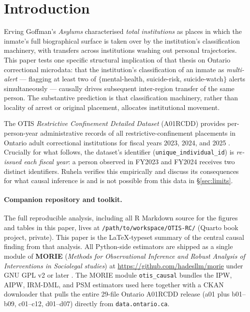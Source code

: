 \documentclass[11pt,a4paper]{article}
\newcommand{\1}{\mathbf{1}}
\theoremstyle{plain}
\theoremstyle{definition}
\begin{document}
\section{Introduction}\label{sec:intro}

Erving Goffman's \emph{Asylums} \cite{goffman1961asylums}
characterised \emph{total institutions} as places in which the
inmate's full biographical surface is taken over by the institution's
classification machinery, with transfers across institutions washing
out personal trajectories.  This paper tests one specific structural
implication of that thesis on Ontario correctional microdata: that
the institution's classification of an inmate as \emph{multi-alert}
— flagging at least two of $\{$mental-health, suicide-risk,
suicide-watch$\}$ alerts simultaneously — causally drives subsequent
inter-region transfer of the same person.  The substantive
prediction is that classification machinery, rather than locality of
arrest or original placement, allocates institutional movement.

The OTIS \emph{Restrictive Confinement Detailed Dataset} (A01RCDD)
provides per-person-year administrative records of all
restrictive-confinement placements in Ontario adult correctional
institutions for fiscal years 2023, 2024, and 2025 \cite{Ontario_SOLGEN_RC_DetailedDataset_2025,Ontario_SOLGEN_DataOnInmatesOntario_2025}.  Crucially for what
follows, the dataset's identifier (\texttt{unique\_individual\_id})
is \emph{re-issued each fiscal year}: a person observed in FY2023 and
FY2024 receives two distinct identifiers.  Ruhela verifies this empirically
and discuss its consequences for what causal inference is and is not
possible from this data in §\ref{sec:limits}.

\paragraph{Companion repository and toolkit.}  The full reproducible
analysis, including all R Markdown source for the figures and
tables in this paper, lives at
\texttt{/path/to/workspace/OTIS-RC/} (Quarto book project,
private).  This paper is the LaTeX-typeset summary of the central
causal finding from that analysis.  All Python-side estimators are
shipped as a single module of \textbf{MORIE} (\emph{Methods for
Observational Inference and Robust Analysis of Interventions in
Sociolegal studies}) at \url{https://github.com/hadesllm/morie}
under GNU GPL v2 or later \cite{morie2026}.  The MORIE module
\texttt{otis\_causal} bundles the IPW, AIPW, IRM-DML, and PSM
estimators used here together with a CKAN downloader that pulls
the entire 29-file Ontario A01RCDD release (a01 plus b01--b09,
c01--c12, d01--d07) directly from \texttt{data.ontario.ca}.
\end{document}
